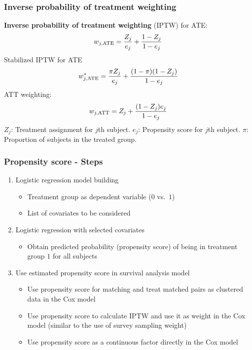 \documentclass[11pt, aspectratio = 169]{beamer}
\begin{document}
\begin{frame}
  \frametitle{Inverse probability of treatment weighting}
  \textbf{Inverse probability of treatment weighting} (IPTW) for ATE:
  \begin{equation*}
    w_{j,\textnormal{ATE}} = \frac{Z_j}{e_j} + \frac{1 - Z_j}{1 - e_j}
  \end{equation*}
  Stabilized IPTW for ATE
  \begin{equation*}
    w_{j,\textnormal{ATE}}^* = \frac{\pi Z_j}{e_j} + \frac{(1 - \pi)(1 - Z_j)}{1 - e_j}
  \end{equation*}
  ATT weighting:
  \begin{equation*}
    w_{j,\textnormal{ATT}} = Z_j + \frac{(1 - Z_j)e_j}{1 - e_j}
  \end{equation*}
  $Z_j$: Treatment assignment for $j$th subject.
  $e_j$: Propensity score for $j$th subject.
  $\pi$: Proportion of subjects in the treated group.
\end{frame}

\begin{frame}
  \frametitle{Propensity score - Steps}
  \begin{enumerate}
    \item Logistic regression model building
    \begin{itemize}
      \item Treatment group as dependent variable ($0$ vs.\ $1$)
      \item List of covariates to be considered
    \end{itemize}
    \item Logistic regression with selected covariates
    \begin{itemize}
      \item Obtain predicted probability (propensity score) of being in treatment group $1$ for all subjects
    \end{itemize}
    \item Use estimated propensity score in survival analysis model
    \begin{itemize}
      \item Use propensity score for matching and treat matched pairs as clustered data in the Cox model
      \item Use propensity score to calculate IPTW and use it as weight in the Cox model (similar to the use of survey sampling weight)
      \item Use propensity score as a continuous factor directly in the Cox model
    \end{itemize}
  \end{enumerate}
\end{frame}
\end{document}
